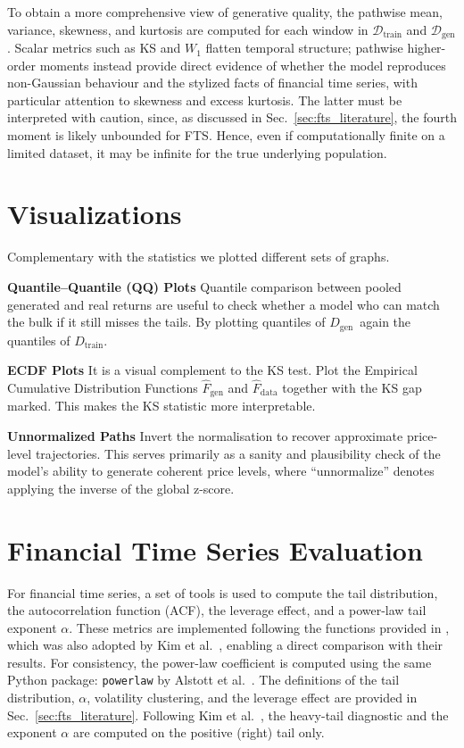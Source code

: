 To obtain a more comprehensive view of generative quality, the pathwise mean, variance,
skewness, and kurtosis are computed for each window in \(\mathcal{D}_{\text{train}}\) and
\(\mathcal{D}_{\text{gen}}\). Scalar metrics such as KS and \(W_1\) flatten temporal
structure; pathwise higher-order moments instead provide direct evidence of whether the
model reproduces non-Gaussian behaviour and the stylized facts of financial time series,
with particular attention to skewness and excess kurtosis. The latter must be interpreted with caution, since, as discussed in Sec.\ \ref{sec:fts_literature}, the fourth moment is likely unbounded for FTS. Hence, even if computationally finite on a limited dataset, it may be infinite for the true underlying population.

\section{Visualizations}
Complementary with the statistics we plotted different sets of graphs.

\textbf{Quantile--Quantile (QQ) Plots} \quad Quantile comparison between pooled generated and real returns are useful to check whether a model who can match the bulk if it still misses the tails. By plotting quantiles of \(D_{\text{gen}}\)\ again the quantiles of \(D_{\text{train}}\).

\textbf{ECDF Plots} \quad It is a visual complement to the KS test. Plot the Empirical Cumulative Distribution Functions \(\hat{F}_{\text{gen}}\) and \(\hat{F}_{\text{data}}\) together with the KS gap marked. This makes the KS statistic more interpretable.

\textbf{Unnormalized Paths} \quad Invert the normalisation to recover approximate price-level trajectories. This serves primarily as a sanity and plausibility check of the model's ability to generate coherent price levels, where ``unnormalize'' denotes applying the inverse of the global z-score.

\section{Financial Time Series Evaluation}
For financial time series, a set of tools is used to compute the tail distribution,
the autocorrelation function (ACF), the leverage effect, and a power-law tail
exponent \(\alpha\). These metrics are implemented following the functions provided
in \cite{stakahashy_fingan}, which was also adopted by Kim et al.\
\cite{kim2025diffusion}, enabling a direct comparison with their results. For
consistency, the power-law coefficient is computed using the same Python package:
\texttt{powerlaw} by Alstott et al.\ \cite{alstott2014powerlaw}. The definitions of the tail distribution, \(\alpha\),
volatility clustering, and the leverage effect are provided in
Sec.\ \ref{sec:fts_literature}. Following Kim et al.\ \cite{kim2025diffusion}, the heavy-tail diagnostic and the exponent \(\alpha\) are computed on the positive (right) tail only.

